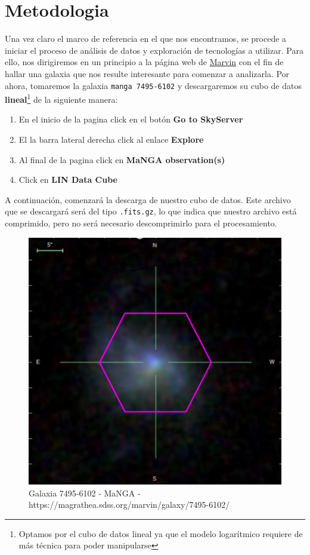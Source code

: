 \documentclass[10pt,twocolumn,a4paper]{opticajnl}
\begin{document}
\section*{Metodologia}
Una vez claro el marco de referencia en el que nos encontramos, se procede a iniciar el proceso de análisis de datos y exploración de tecnologías a utilizar. Para ello, nos dirigiremos en un principio a la página web de \href{https://magrathea.sdss.org/marvin/}{Marvin} con el fin de hallar una galaxia que nos resulte interesante para comenzar a analizarla. Por ahora, tomaremos la galaxia \verb|manga 7495-6102| y descargaremos su cubo de datos \textbf{lineal}\footnote{Optamos por el cubo de datos lineal ya que el modelo logarítmico requiere de más técnica para poder manipularse} de la siguiente manera:
\begin{enumerate}
    \item En el inicio de la pagina click en el botón \textbf{Go to SkyServer}
    \item El la barra lateral derecha click al enlace \textbf{Explore}
    \item Al final de la pagina click en \textbf{MaNGA observation(s)}
    \item Click en \textbf{LIN Data Cube}
\end{enumerate}
A continuación, comenzará la descarga de nuestro cubo de datos. Este archivo que se descargará será del tipo \verb|.fits.gz|, lo que indica que nuestro archivo está comprimido, pero no será necesario descomprimirlo para el procesamiento.

\begin{figure}
    \centering
    \includegraphics[width=0.8\linewidth]{manga-7495-6102.png}
    \caption{Galaxia 7495-6102 - MaNGA - https://magrathea.sdss.org/marvin/galaxy/7495-6102/}
    \label{fig:interfacemarvin}
\end{figure}
 
\end{document}
